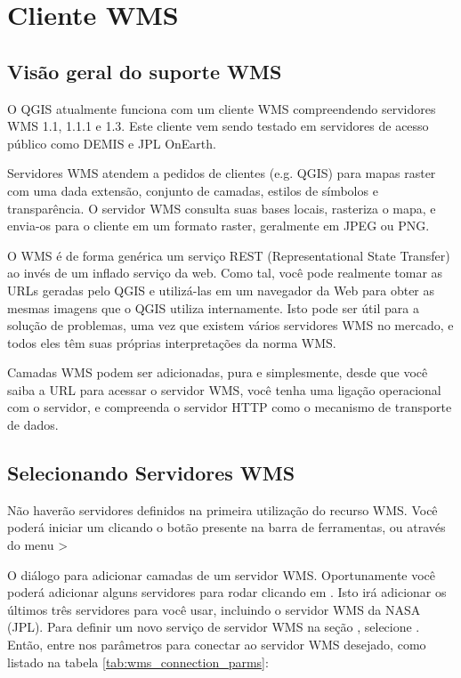\section{Cliente WMS}\label{sec:ogc-wms}

\subsection{Visão geral do suporte WMS}\label{sec:ogc-wms-about}

O QGIS atualmente funciona com um cliente WMS compreendendo servidores WMS 1.1, 1.1.1 e 1.3. Este cliente vem sendo testado em servidores de acesso público como DEMIS e JPL OnEarth.

Servidores WMS atendem a pedidos de clientes (e.g. QGIS) para mapas raster com uma dada extensão, conjunto de camadas, estilos de símbolos e transparência. O servidor WMS consulta suas bases locais, rasteriza o mapa, e envia-os para o cliente em um formato raster, geralmente em JPEG ou PNG.

O WMS é de forma genérica um serviço REST (Representational State Transfer) ao invés de um inflado serviço da web. Como tal, você pode realmente tomar as URLs geradas pelo
QGIS e utilizá-las em um navegador da Web para obter as mesmas imagens que o QGIS utiliza internamente. Isto pode ser útil para a solução de problemas, uma vez que existem
vários servidores WMS no mercado, e todos eles têm suas próprias
interpretações da norma WMS.
	
Camadas WMS  podem ser adicionadas, pura e simplesmente, desde que você saiba a URL para acessar o servidor WMS, você tenha uma ligação operacional com o servidor, e
compreenda o servidor HTTP como o mecanismo de transporte de dados.

\subsection{Selecionando Servidores WMS}\label{sec:ogc-wms-servers}

Não haverão servidores definidos na primeira utilização do recurso WMS. Você poderá iniciar um clicando o botão   presente na barra de ferramentas, ou através do menu >

O diálogo  para adicionar camadas de um servidor WMS. Oportunamente você poderá adicionar alguns servidores para rodar clicando em . Isto irá adicionar os últimos três servidores para você usar, incluindo o servidor WMS da NASA (JPL). Para definir um novo serviço de servidor WMS na seção , 
selecione . Então, entre nos parâmetros para conectar ao servidor WMS desejado, como listado na tabela \ref{tab:wms_connection_parms}:

